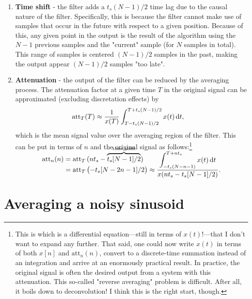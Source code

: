 \documentclass{ajhlabreport}
\begin{document}
\begin{enumerate}
\item{\textbf{Time shift} - the filter adds a $t_s (N - 1)/2$ time lag due to
the causal nature of the filter. Specifically, this is because the filter cannot
make use of samples that occur in the future with respect to a given position.
Because of this, any given point in the output is the result of the algorithm
using the $N - 1$ previous samples and the "current" sample (for $N$ samples in
total). This range of samples is centered $(N - 1)/2$ samples in the past,
making the output appear $(N - 1)/2$ samples "too late".}
\item{\textbf{Attenuation} - the output of the filter can be reduced by the
averaging process. The attenuation factor at a given time $T$ in the original
signal can be approximated (excluding discretation effects) by \begin{align}
%
\mathrm{att}_T(T) &\approx \frac{1}{x(T)} \int_{T - t_s(N-1)/2}^{T + t_s(N-1)/2} x(t) \dif{t} \text,
\label{eq:attenuation-factor-T}
%
\end{align} which is the mean signal value over the averaging region of the
filter. This can be put in terms of $n$ and the original signal as
follows:\footnote{This is which is a differential equation---still in terms of
$x(t)$!---that I don't want to expand any further. That said, one could now
write $x(t)$ in terms of both $x[n]$ and $\mathrm{att}_n(n)$, convert to a
discrete-time summation instead of an integration and arrive at an enormously
practical result. In practice, the original signal is often the desired output
from a system with this attenuation. This so-called "reverse averaging" problem
is difficult. After all, it boils down to deconvolution! I think this is the
right start, though.}\begin{align}
%
\mathrm{att}_n(n) &= \mathrm{att}_T\left(n t_s - \smash{\overbrace{t_s[N-1]/2}^\text{time shift}}\right) \notag \\
                  &= \mathrm{att}_T\left(-t_s[N-2n-1]/2\right)
\approx \smash{
    \frac{\displaystyle{\int_{-t_s(N-n-1)}^{T + n t_s} x(t) \dif{t}}}{x(n t_s - t_s[N-1]/2)} \notag
}\text.
\label{eq:attenuation-factor-n}
%
\end{align}
}
\end{enumerate}


\newpage
\section{Averaging a noisy sinusoid}%
\end{document}
